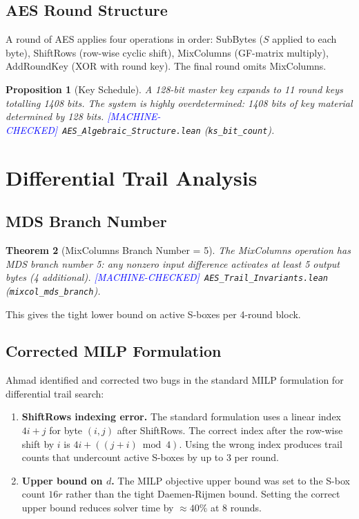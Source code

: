 \documentclass[11pt,letterpaper]{article}
\newtheorem{theorem}{Theorem}[section]
\newtheorem{proposition}[theorem]{Proposition}
\newcommand{\MC}{\textcolor{blue}{[MACHINE-CHECKED]}}
\begin{document}
\subsection{AES Round Structure}

A round of AES applies four operations in order:
SubBytes ($S$ applied to each byte), ShiftRows (row-wise cyclic shift),
MixColumns (GF-matrix multiply), AddRoundKey (XOR with round key).
The final round omits MixColumns.

\begin{proposition}[Key Schedule]
A 128-bit master key expands to 11 round keys totalling 1408 bits.
The system is highly overdetermined: 1408 bits of key material determined
by 128 bits.  \MC\ \texttt{AES\_Algebraic\_Structure.lean}
(\texttt{ks\_bit\_count}).
\end{proposition}

\section{Differential Trail Analysis}
\label{sec:trails}

\subsection{MDS Branch Number}

\begin{theorem}[MixColumns Branch Number = 5]
\label{thm:branch}
The MixColumns operation has MDS branch number 5: any nonzero input
difference activates at least 5 output bytes (4 additional).
\MC\ \texttt{AES\_Trail\_Invariants.lean} (\texttt{mixcol\_mds\_branch}).
\end{theorem}

This gives the tight lower bound on active S-boxes per 4-round block.

\subsection{Corrected MILP Formulation}

Ahmad identified and corrected two bugs in the standard MILP formulation
for differential trail search:

\begin{enumerate}[nosep]
\item \textbf{ShiftRows indexing error.}  The standard formulation uses a
  linear index $4i + j$ for byte $(i,j)$ after ShiftRows.  The correct
  index after the row-wise shift by $i$ is $4i + ((j+i) \bmod 4)$.
  Using the wrong index produces trail counts that undercount active S-boxes
  by up to 3 per round.

\item \textbf{Upper bound on $d$.}  The MILP objective upper bound was set
  to the S-box count $16r$ rather than the tight Daemen-Rijmen bound.
  Setting the correct upper bound reduces solver time by $\approx 40\%$ at
  8 rounds.
\end{enumerate}
\end{document}
